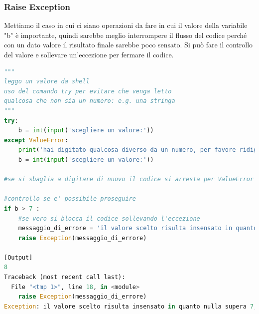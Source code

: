 \documentclass[10pt,a4paper]{article}
\begin{document}
\subsubsection{Raise Exception}
Mettiamo il caso in cui ci siano operazioni da fare in cui il valore della variabile "b" è importante, quindi sarebbe meglio interrompere il flusso del codice perché con un dato valore il risultato finale sarebbe poco sensato. Si può fare il controllo del valore e sollevare un'eccezione per fermare il codice.
\begin{lstlisting}[language=Python]
"""
leggo un valore da shell
uso del comando try per evitare che venga letto
qualcosa che non sia un numero: e.g. una stringa
"""
try:
    b = int(input('scegliere un valore:'))
except ValueError:
    print('hai digitato qualcosa diverso da un numero, per favore ridigitare')
    b = int(input('scegliere un valore:'))
    
#se si sbaglia a digitare di nuovo il codice si arresta per ValueError

#controllo se e' possibile proseguire
if b > 7 :
    #se vero si blocca il codice sollevando l'eccezione
    messaggio_di_errore = 'il valore scelto risulta insensato in quanto nulla supera 7, misura massima di ogni cosa'
    raise Exception(messaggio_di_errore)

[Output]
8
Traceback (most recent call last):
  File "<tmp 1>", line 18, in <module>
    raise Exception(messaggio_di_errore)
Exception: il valore scelto risulta insensato in quanto nulla supera 7, misura massima di ogni cosa
\end{lstlisting}
\end{document}

